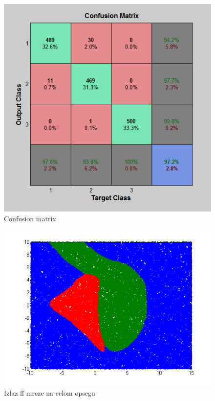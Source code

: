 \documentclass{report}
\begin{document}
\begin{enumerate}
\begin{enumerate}
\begin{figure}[!h]
\begin{center}
\includegraphics[scale=0.7]{B1confussionFF3early.png}
\caption{Confusion matrix}
\end{center}
\end{figure}

\begin{figure}[!h]
\begin{center}
\includegraphics[scale=0.8]{B1outputFF3earlyRandom50000.png}
\caption{Izlaz ff mreze na celom opsegu}
\end{center}
\end{figure}


\end{enumerate}
\end{enumerate}
\end{document}
